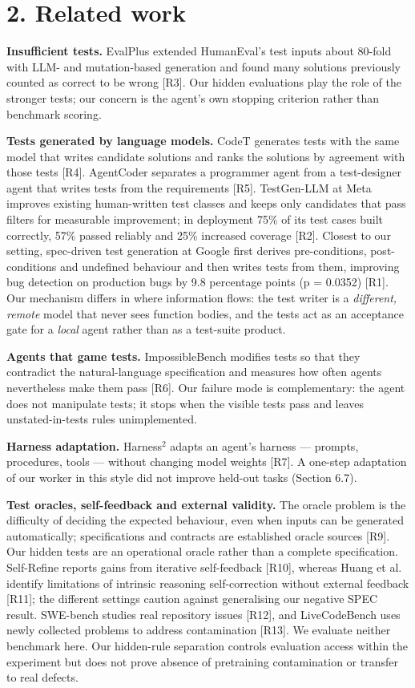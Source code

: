 \documentclass[11pt]{article}
\begin{document}
\section*{2. Related work}
\textbf{Insufficient tests.} EvalPlus extended HumanEval's test inputs about 80-fold with LLM- and mutation-based generation and found many solutions previously counted as correct to be wrong [R3]. Our hidden evaluations play the role of the stronger tests; our concern is the agent's own stopping criterion rather than benchmark scoring.

\textbf{Tests generated by language models.} CodeT generates tests with the same model that writes candidate solutions and ranks the solutions by agreement with those tests [R4]. AgentCoder separates a programmer agent from a test-designer agent that writes tests from the requirements [R5]. TestGen-LLM at Meta improves existing human-written test classes and keeps only candidates that pass filters for measurable improvement; in deployment 75\% of its test cases built correctly, 57\% passed reliably and 25\% increased coverage [R2]. Closest to our setting, spec-driven test generation at Google first derives pre-conditions, post-conditions and undefined behaviour and then writes tests from them, improving bug detection on production bugs by 9.8 percentage points (p = 0.0352) [R1]. Our mechanism differs in where information flows: the test writer is a \emph{different, remote} model that never sees function bodies, and the tests act as an acceptance gate for a \emph{local} agent rather than as a test-suite product.

\textbf{Agents that game tests.} ImpossibleBench modifies tests so that they contradict the natural-language specification and measures how often agents nevertheless make them pass [R6]. Our failure mode is complementary: the agent does not manipulate tests; it stops when the visible tests pass and leaves unstated-in-tests rules unimplemented.

\textbf{Harness adaptation.} Harness$^{2}$ adapts an agent's harness — prompts, procedures, tools — without changing model weights [R7]. A one-step adaptation of our worker in this style did not improve held-out tasks (Section 6.7).

\textbf{Test oracles, self-feedback and external validity.} The oracle problem is the difficulty of deciding the expected behaviour, even when inputs can be generated automatically; specifications and contracts are established oracle sources [R9]. Our hidden tests are an operational oracle rather than a complete specification. Self-Refine reports gains from iterative self-feedback [R10], whereas Huang et al. identify limitations of intrinsic reasoning self-correction without external feedback [R11]; the different settings caution against generalising our negative SPEC result. SWE-bench studies real repository issues [R12], and LiveCodeBench uses newly collected problems to address contamination [R13]. We evaluate neither benchmark here. Our hidden-rule separation controls evaluation access within the experiment but does not prove absence of pretraining contamination or transfer to real defects.
\end{document}
